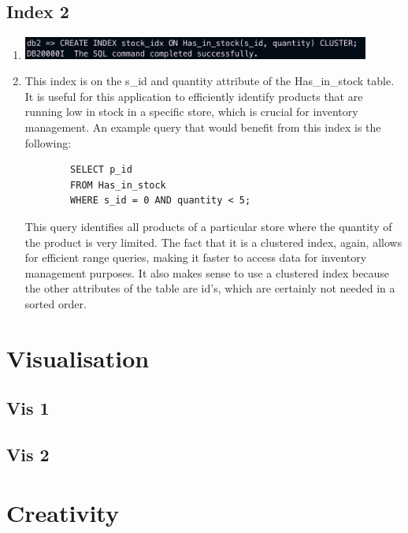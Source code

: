 \documentclass[a4paper,11pt]{article}
\begin{document}
\subsection*{Index 2}
\begin{enumerate}[label=(\alph*)]
    \item \includegraphics[width=0.9\textwidth]{images/idx2.png}
    \item This index is on the s\_id and quantity attribute of the Has\_in\_stock table. 
    It is useful for this application to efficiently identify products that are running low in stock in a specific store, which is crucial for inventory management.
    An example query that would benefit from this index is the following: 
    \begin{lstlisting}
        SELECT p_id 
        FROM Has_in_stock 
        WHERE s_id = 0 AND quantity < 5;
    \end{lstlisting}
    This query identifies all products of a particular store where the quantity of the product is very limited.
    The fact that it is a clustered index, again, allows for efficient range queries, making it faster to access data for inventory management purposes.
    It also makes sense to use a clustered index because the other attributes of the table are id's, which are certainly not needed in a sorted order. 
\end{enumerate}
\section*{Visualisation}

\subsection*{Vis 1}

\subsection*{Vis 2}

\section*{Creativity}
\end{document}
